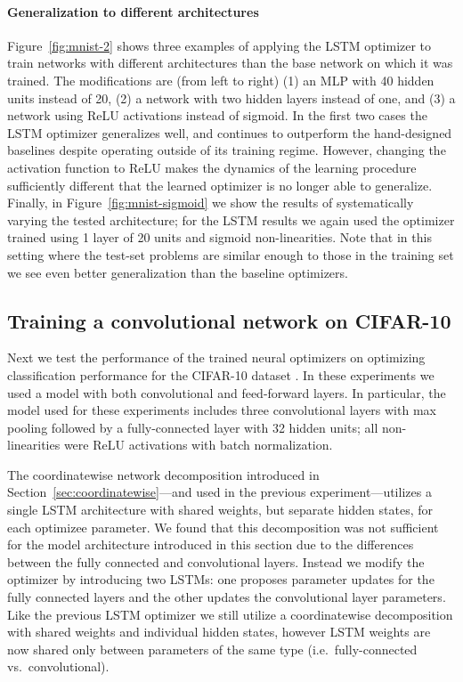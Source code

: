 \documentclass{article}
\begin{document}
\paragraph{Generalization to different architectures} Figure~\ref{fig:mnist-2}
shows three examples of applying the LSTM optimizer to train networks with
different architectures than the base network on which it was trained.  The
modifications are (from left to right) (1) an MLP with 40 hidden units instead
of 20, (2) a network with two hidden layers instead of one, and (3) a network
using ReLU activations instead of sigmoid.  In the first two cases the LSTM
optimizer generalizes well, and continues to outperform the hand-designed
baselines despite operating outside of its training regime.  However, changing
the activation function to ReLU makes the dynamics of the learning procedure
sufficiently different that the learned optimizer is no longer able to
generalize. Finally, in Figure~\ref{fig:mnist-sigmoid} we show the results of
systematically varying the tested architecture; for the LSTM results we again
used the optimizer trained using 1 layer of 20 units and sigmoid
non-linearities. Note that in this setting where the test-set problems are
similar enough to those in the training set we see even better generalization
than the baseline optimizers.

\subsection{Training a convolutional network on CIFAR-10}

Next we test the performance of the trained neural optimizers on optimizing
classification performance for the CIFAR-10 dataset \citep{krizhevsky:2009}. In
these experiments we used a model with both convolutional and feed-forward
layers. In particular, the model used for these experiments includes three
convolutional layers with max pooling followed by a fully-connected layer with
32 hidden units; all non-linearities were ReLU activations with batch
normalization.

The coordinatewise network decomposition introduced in
Section~\ref{sec:coordinatewise}---and used in the previous
experiment---utilizes a single LSTM architecture with shared weights, but
separate hidden states, for each optimizee parameter. We found that this
decomposition was not sufficient for the model architecture introduced in this
section due to the differences between the fully connected and convolutional
layers. Instead we modify the optimizer by introducing two LSTMs: one proposes
parameter updates for the fully connected layers and the other updates the
convolutional layer parameters. Like the previous LSTM optimizer we still
utilize a coordinatewise decomposition with shared weights and individual
hidden states, however LSTM weights are now shared only between parameters of
the same type (i.e.\ fully-connected vs.\ convolutional).
\end{document}
